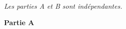 
\medskip

\emph{Les parties {\rm A} et {\rm B} sont indépendantes.}

\medskip

\textbf{Partie A}

\medskip

%
%
%
%
%
%

\medskip

